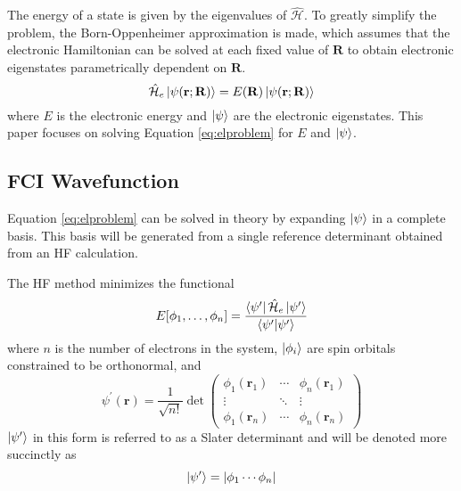 \documentclass[final,3p,times,twocolumn]{elsarticle}
\newcommand{\ham}{\hat{\mathcal{H}}}
\begin{document}
The energy of a state is given by the eigenvalues of $\ham$. To greatly simplify the problem, the Born-Oppenheimer approximation\cite{bo} is made, which assumes that the electronic Hamiltonian can be solved at each fixed value of $\mathbf{R}$ to obtain electronic eigenstates parametrically dependent on $\mathbf{R}$.
\begin{equation}\label{eq:elproblem}
\ham_e \ket{\psi(\mathbf{r};\mathbf{R})} = E(\mathbf{R}) \ket{\psi(\mathbf{r};\mathbf{R})}
\end{equation}
where $E$ is the electronic energy and $\ket{\psi}$ are the electronic eigenstates. This paper focuses on solving Equation \eqref{eq:elproblem} for $E$ and $\ket{\psi}$.

\subsection{FCI Wavefunction} \label{sec:wf}
Equation \eqref{eq:elproblem} can be solved in theory by expanding $\ket{\psi}$ in a complete basis. This basis will be generated from a single reference determinant obtained from an HF calculation. 

The HF method\cite{hartree,fock,roothaan} minimizes the functional
\begin{equation}
E[\phi_1, \ldots, \phi_n] = \dfrac{\bra{\psi^\prime}\ham_e\ket{\psi^\prime}}{\bra{\psi^\prime}\ket{\psi^\prime}}
\end{equation}
where $n$ is the number of electrons in the system, $\ket{\phi_i}$ are spin orbitals constrained to be orthonormal, and 
\begin{equation} \label{eq:det}
\psi^\prime(\mathbf{r}) = \dfrac{1}{\sqrt{n!}}\det\begin{pmatrix} \phi_1(\mathbf{r}_1) & \cdots & \phi_n(\mathbf{r}_1) \\ \vdots & \ddots & \vdots \\
\phi_1(\mathbf{r}_n) & \cdots & \phi_n(\mathbf{r}_n) \end{pmatrix}
\end{equation}
$\ket{\psi^\prime}$ in this form is referred to as a Slater determinant\cite{slater} and will be denoted more succinctly as
\begin{equation}
\ket{\psi^\prime} = |\phi_1 \cdots \phi_n|
\end{equation}
\end{document}
